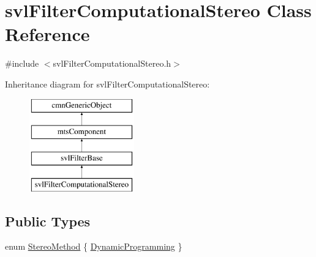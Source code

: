 \hypertarget{classsvl_filter_computational_stereo}{}\section{svl\+Filter\+Computational\+Stereo Class Reference}
\label{classsvl_filter_computational_stereo}


{\ttfamily \#include $<$svl\+Filter\+Computational\+Stereo.\+h$>$}

Inheritance diagram for svl\+Filter\+Computational\+Stereo\+:\begin{figure}[H]
\begin{center}
\leavevmode
\includegraphics[height=4.000000cm]{d8/d92/classsvl_filter_computational_stereo}
\end{center}
\end{figure}
\subsection*{Public Types}
\begin{DoxyCompactItemize}
\item 
enum \hyperlink{classsvl_filter_computational_stereo_aa424620e36780b986f928099b25f0e91}{Stereo\+Method} \{ \hyperlink{classsvl_filter_computational_stereo_aa424620e36780b986f928099b25f0e91a32b3649abc4439568d16df5fb44579df}{Dynamic\+Programming}
 \}
\end{DoxyCompactItemize}
